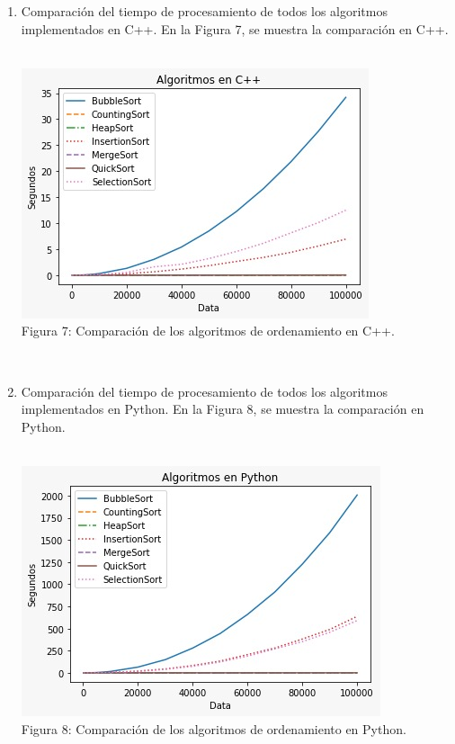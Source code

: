 \documentclass{article}
\begin{document}
\begin{enumerate}
\begin{enumerate}
        \item Comparación del tiempo de procesamiento de todos los algoritmos implementados en C++. En la Figura 7, se muestra la comparación en C++.\\\\
    
        \begin{figure7}
        \includegraphics{c++.jpeg}\\
        \caption{Figura 7: Comparación de los algoritmos de ordenamiento en C++.}
        \centering
        \end{figure7}\\
        \clearpage
        
        \item Comparación del tiempo de procesamiento de todos los algoritmos implementados en Python. En la Figura 8, se muestra la comparación en Python.\\\\
    
        \begin{figure8}
        \includegraphics{python.jpeg}\\
        \caption{Figura 8: Comparación de los algoritmos de ordenamiento en Python.}
        \centering
        \end{figure8}\\
        \clearpage
        
  
    \end{enumerate}
	  	
	\end{enumerate}


	
	
	


		
	
\end{document}
